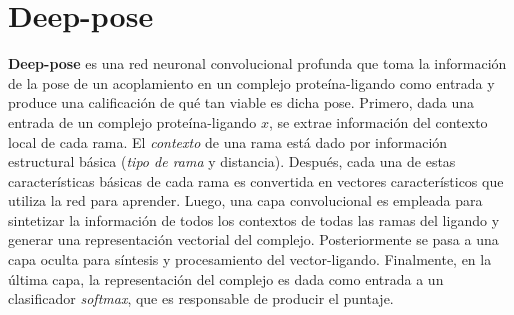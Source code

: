 \section{Deep-pose}
\textbf{Deep-pose} es una red neuronal convolucional profunda que toma
la información de la pose de un acoplamiento en un complejo
proteína-ligando como entrada y produce una calificación de qué tan
viable es dicha pose.  Primero, dada una entrada de un complejo
proteína-ligando $x$, se extrae información del contexto local de cada
rama. El \textit{contexto} de una rama está dado por información
estructural básica (\textit{tipo de rama} y distancia). Después, cada
una de estas características básicas de cada rama es convertida en
vectores característicos que utiliza la red para aprender. Luego, una
capa convolucional es empleada para sintetizar la información de todos
los contextos de todas las ramas del ligando y generar una
representación vectorial del complejo. Posteriormente se pasa a una
capa oculta para síntesis y procesamiento del
vector-ligando. Finalmente, en la última capa, la representación del
complejo es dada como entrada a un clasificador \textit{softmax}, que
es responsable de producir el puntaje.

